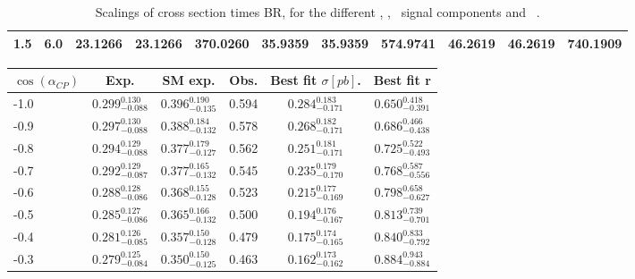 \begin{landscape}
\begin{table}[h!]
\begin{tabular}{ll rrr rrr rrr}
   1.5 & 6.0    & 23.1266 & 23.1266 & 370.0260   & 35.9359 & 35.9359 & 574.9741   & 46.2619 & 46.2619 & 740.1909 \\\hline
    \end{tabular}                                                                                                                                                                          
    \caption[Scalings of $\sigma\times$BR for the signal components and \ ]{Scalings of cross section times BR, for the different \ttH, \tHq, \tHW\ signal components and \ .}\label{tab:xsbrscalingK6_1p5}                              
 \end{table}   

\end{landscape}

\begin{table}[h!]
  \centering
  \footnotesize
  \begin{tabular}{l| ccc | cc}\hline
    $\cos(\alpha_{CP})$& Exp.                     & SM exp.                  & Obs.  & Best fit $\sigma [pb]$.  & Best fit r               \\ \hline
    -1.0             & $0.299^{0.130}_{-0.088}$ & $0.396^{0.190}_{-0.135}$ & 0.594 & $0.284^{0.183}_{-0.171}$ & $0.650^{0.418}_{-0.391}$ \\
    -0.9             & $0.297^{0.130}_{-0.088}$ & $0.388^{0.184}_{-0.132}$ & 0.578 & $0.268^{0.182}_{-0.171}$ & $0.686^{0.466}_{-0.438}$ \\
    -0.8             & $0.294^{0.129}_{-0.088}$ & $0.377^{0.179}_{-0.127}$ & 0.562 & $0.251^{0.181}_{-0.171}$ & $0.725^{0.522}_{-0.493}$ \\
    -0.7             & $0.292^{0.129}_{-0.087}$ & $0.377^{0.165}_{-0.132}$ & 0.545 & $0.235^{0.179}_{-0.170}$ & $0.768^{0.587}_{-0.556}$ \\
    -0.6             & $0.288^{0.128}_{-0.086}$ & $0.368^{0.155}_{-0.128}$ & 0.523 & $0.215^{0.177}_{-0.169}$ & $0.798^{0.658}_{-0.627}$ \\
    -0.5             & $0.285^{0.127}_{-0.086}$ & $0.365^{0.166}_{-0.132}$ & 0.500 & $0.194^{0.176}_{-0.167}$ & $0.813^{0.739}_{-0.701}$ \\
    -0.4             & $0.281^{0.126}_{-0.085}$ & $0.357^{0.150}_{-0.128}$ & 0.479 & $0.175^{0.174}_{-0.165}$ & $0.840^{0.833}_{-0.792}$ \\
    -0.3             & $0.279^{0.125}_{-0.084}$ & $0.350^{0.150}_{-0.125}$ & 0.463 & $0.162^{0.173}_{-0.162}$ & $0.884^{0.943}_{-0.884}$ \\

\end{tabular}
\end{table}
